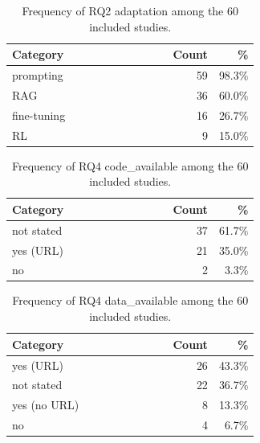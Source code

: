 \begin{table}[tbp]
\centering
\caption{Frequency of RQ2 adaptation among the 60 included studies.}
\begin{tabular}{@{}p{0.65\linewidth}rr@{}}
\hline
Category & Count & \% \\
\hline
prompting & 59 & 98.3\% \\
RAG & 36 & 60.0\% \\
fine-tuning & 16 & 26.7\% \\
RL & 9 & 15.0\% \\
\hline
\end{tabular}
\end{table}

\begin{table}[tbp]
\centering
\caption{Frequency of RQ4 code\_available among the 60 included studies.}
\begin{tabular}{@{}p{0.65\linewidth}rr@{}}
\hline
Category & Count & \% \\
\hline
not stated & 37 & 61.7\% \\
yes (URL) & 21 & 35.0\% \\
no & 2 & 3.3\% \\
\hline
\end{tabular}
\end{table}

\begin{table}[tbp]
\centering
\caption{Frequency of RQ4 data\_available among the 60 included studies.}
\begin{tabular}{@{}p{0.65\linewidth}rr@{}}
\hline
Category & Count & \% \\
\hline
yes (URL) & 26 & 43.3\% \\
not stated & 22 & 36.7\% \\
yes (no URL) & 8 & 13.3\% \\
no & 4 & 6.7\% \\
\hline
\end{tabular}
\end{table}
